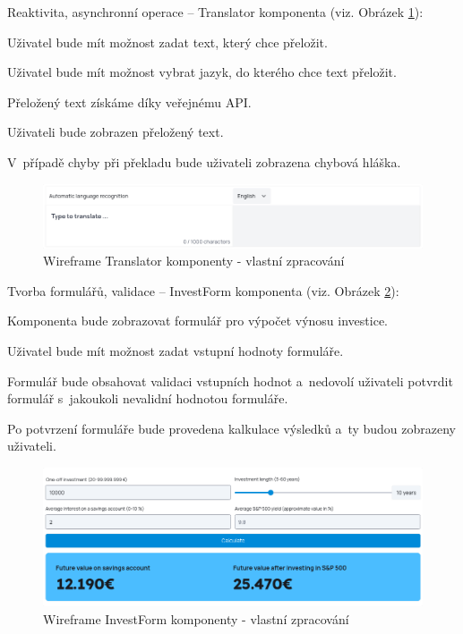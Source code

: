 \begin{citemize}
	\item Reaktivita, asynchronní operace -- Translator komponenta (viz. Obrázek \ref{fig:translatorwireframe}):
	
	\begin{cenumerate}
		\item Uživatel bude mít možnost zadat text, který chce přeložit.
		\item Uživatel bude mít možnost vybrat jazyk, do kterého chce text přeložit.
		\item Přeložený text získáme díky veřejnému API.
		\item Uživateli bude zobrazen přeložený text.
		\item V~případě chyby při překladu bude uživateli zobrazena chybová hláška.
	\end{cenumerate}

	\begin{figure}[htb]
		\centering
			\includegraphics[width=1\textwidth]{images/Translator-wireframe.png}
		\caption[Wireframe Translator komponenty]{Wireframe Translator komponenty - vlastní zpracování}
		\label{fig:translatorwireframe}
	\end{figure}

	\item Tvorba formulářů, validace -- InvestForm komponenta (viz. Obrázek \ref{fig:investformwireframe}):
	
	\begin{cenumerate}
		\item Komponenta bude zobrazovat formulář pro výpočet výnosu investice.
		\item Uživatel bude mít možnost zadat vstupní hodnoty formuláře.
		\item Formulář bude obsahovat validaci vstupních hodnot a~nedovolí uživateli potvrdit formulář s~jakoukoli nevalidní hodnotou formuláře.
		\item Po potvrzení formuláře bude provedena kalkulace výsledků a~ty budou zobrazeny uživateli.
	\end{cenumerate}

	\begin{figure}[htb]
		\centering
			\includegraphics[width=1\textwidth]{images/InvestForm-wireframe.png}
		\caption[Wireframe InvestForm komponenty]{Wireframe InvestForm komponenty - vlastní zpracování}
		\label{fig:investformwireframe}
	\end{figure}


\end{citemize}
